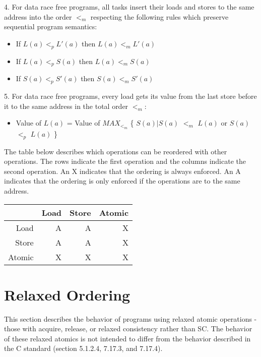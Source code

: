 4. For data race free programs, all tasks insert their loads and stores to the
same address into the order $<_m$ respecting the following rules which preserve
sequential program semantics:

\begin{itemize}
  \item If $L(a) <_p L'(a)$ then $L(a) <_m L'(a)$
  \item If $L(a) <_p S(a)$ then $L(a) <_m S(a)$
  \item If $S(a) <_p S'(a)$ then $S(a) <_m S'(a)$
\end{itemize}

5. For data race free programs, every load gets its value from the last store before it to the same address in the total order $<_m$:
\begin{itemize}
  \item Value of $L(a)$ = Value of $MAX_{<_m}$ \{ $S(a)|S(a)$ $<_m$ $L(a)$ or $S(a)$ $<_p$ $L(a)$ \}
\end{itemize}

The table below describes which operations can be reordered with other
operations.  The rows indicate the first operation and the columns indicate the
second operation. An X indicates that the ordering is always enforced. An A
indicates that the ordering is only enforced if the operations are to the same
address.

\begin{center}
\begin{tabular}{|r|r|r|r|}
\hline
       & Load & Store & Atomic \\ \hline
Load   &    A &     A &      X \\ \hline
Store  &    A &     A &      X \\ \hline
Atomic &    X &     X &      X \\ \hline
\end{tabular}
\end{center}

\section{Relaxed Ordering}

This section describes the behavior of programs using relaxed atomic operations
- those with acquire, release, or relaxed consistency rather than SC. The
behavior of these relaxed atomics is not intended to differ from the behavior
described in the C standard (section 5.1.2.4, 7.17.3, and 7.17.4).

